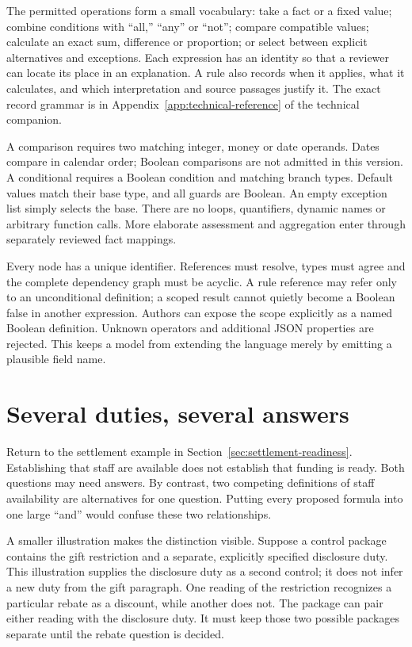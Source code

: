 \documentclass[12pt,a4paper,oneside,openany]{book}
\begin{document}
The permitted operations form a small vocabulary: take a fact or a fixed
value; combine conditions with ``all,'' ``any'' or ``not''; compare compatible
values; calculate an exact sum, difference or proportion; or select between
explicit alternatives and exceptions. Each expression has an identity so that a
reviewer can locate its place in an explanation. A rule also records when it
applies, what it calculates, and which interpretation and source passages justify
it. The exact record grammar is in Appendix~\ref{app:technical-reference} of the technical companion.

A comparison requires two matching integer, money or date operands. Dates
compare in calendar order; Boolean comparisons are not admitted in this version.
A conditional requires a Boolean condition and matching branch types. Default
values match their base type, and all guards are Boolean. An empty exception
list simply selects the base. There are no loops, quantifiers, dynamic names or
arbitrary function calls. More elaborate assessment and aggregation enter
through separately reviewed fact mappings.

Every node has a unique identifier. References must resolve, types must agree
and the complete dependency graph must be acyclic. A rule reference may refer
only to an unconditional definition; a scoped result cannot quietly become a
Boolean false in another expression. Authors can expose the scope explicitly
as a named Boolean definition. Unknown operators and additional JSON properties
are rejected. This keeps a model from extending the language merely by emitting
a plausible field name.

\section{Several duties, several answers}
\label{sec:control-composition}

Return to the settlement example in Section~\ref{sec:settlement-readiness}.
Establishing that staff are available does not establish that funding is ready.
Both questions may need answers. By contrast, two competing definitions of
staff availability are alternatives for one question. Putting every proposed
formula into one large ``and'' would confuse these two relationships.

A smaller illustration makes the distinction visible. Suppose a control package
contains the gift restriction and a separate, explicitly specified disclosure
duty. This illustration supplies the disclosure duty as a second control; it
does not infer a new duty from the gift paragraph. One reading of the restriction
recognizes a particular rebate as a discount, while another does not. The
package can pair either reading with the disclosure duty. It must keep those
two possible packages separate until the rebate question is decided.
\end{document}
